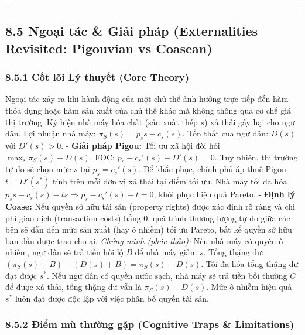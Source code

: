 \documentclass[
]{article}
\begin{document}
\begin{center}\rule{0.5\linewidth}{0.5pt}\end{center}

\subsection{8.5 Ngoại tác \& Giải pháp (Externalities Revisited:
Pigouvian vs
Coasean)}\label{ngoux1ea1i-tuxe1c-giux1ea3i-phuxe1p-externalities-revisited-pigouvian-vs-coasean}

\subsubsection{8.5.1 Cốt lõi Lý thuyết (Core
Theory)}\label{cux1ed1t-luxf5i-luxfd-thuyux1ebft-core-theory-29}

Ngoại tác xảy ra khi hành động của một chủ thể ảnh hưởng trực tiếp đến
hàm thỏa dụng hoặc hàm sản xuất của chủ thể khác mà không thông qua cơ
chế giá thị trường. Ký hiệu nhà máy hóa chất (sản xuất thép \(s\)) xả
thải gây hại cho ngư dân. Lợi nhuận nhà máy:
\(\pi_S(s) = p_s s - c_s(s)\). Tổn thất của ngư dân: \(D(s)\) với
\(D'(s) > 0\). - \textbf{Giải pháp Pigou:} Tối ưu xã hội đòi hỏi
\(\max_s \pi_S(s) - D(s)\). FOC: \(p_s - c_s'(s) - D'(s) = 0\). Tuy
nhiên, thị trường tự do sẽ chọn mức \(s\) tại \(p_s = c_s'(s)\). Để khắc
phục, chính phủ áp thuế Pigou \(t = D'(s^*)\) tính trên mỗi đơn vị xả
thải tại điểm tối ưu. Nhà máy tối đa hóa
\(p_s s - c_s(s) - ts \Rightarrow p_s - c_s'(s) - t = 0\), khôi phục
hiệu quả Pareto. - \textbf{Định lý Coase:} Nếu quyền sở hữu tài sản
(property rights) được xác định rõ ràng và chi phí giao dịch
(transaction costs) bằng 0, quá trình thương lượng tự do giữa các bên sẽ
dẫn đến mức sản xuất (hay ô nhiễm) tối ưu Pareto, bất kể quyền sở hữu
ban đầu được trao cho ai. \emph{Chứng minh (phác thảo):} Nếu nhà máy có
quyền ô nhiễm, ngư dân sẽ trả tiền hối lộ \(B\) để nhà máy giảm \(s\).
Tổng thặng dư: \((\pi_S(s) + B) - (D(s) + B) = \pi_S(s) - D(s)\). Tối đa
hóa tổng thặng dư đạt được \(s^*\). Nếu ngư dân có quyền nước sạch, nhà
máy sẽ trả tiền bồi thường \(C\) để được xả thải, tổng thặng dư vẫn là
\(\pi_S(s) - D(s)\). Mức ô nhiễm hiệu quả \(s^*\) luôn đạt được độc lập
với việc phân bổ quyền tài sản.

\subsubsection{8.5.2 Điểm mù thường gặp (Cognitive Traps \&
Limitations)}\label{ux111iux1ec3m-muxf9-thux1b0ux1eddng-gux1eb7p-cognitive-traps-limitations-60}
\end{document}
